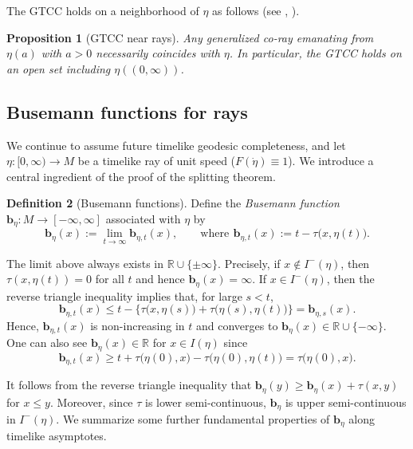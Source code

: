 \documentclass[a4paper,11pt]{article}
\numberwithin{equation}{section}
\theoremstyle{definition}
\newtheorem{definition}{Definition}[section]
\theoremstyle{plain}
\newtheorem{proposition}[definition]{Proposition}
\newcommand{\lra}{\longrightarrow}
\newcommand{\R}{\ensuremath{\mathbb{R}}}
\newcommand{\bb}{\ensuremath{\mathbf{b}}}
\begin{document}
The GTCC holds on a neighborhood of $\eta$ as follows (see \cite[Proposition~4.10]{LMO3}, \cite[Proposition~5.1, Corollary~5.2]{GH}).

\begin{proposition}[GTCC near rays]\label{pr:GH5.1}
Any generalized co-ray emanating from $\eta(a)$ with $a>0$
necessarily coincides with $\eta$.
In particular, the GTCC holds on an open set including $\eta((0,\infty))$.
\end{proposition}

\subsection{Busemann functions for rays}\label{ssc:rays}

We continue to assume future timelike geodesic completeness,
and let $\eta\colon [0,\infty)\lra M$ be a timelike ray of unit speed ($F(\dot{\eta}) \equiv 1$).
We introduce a central ingredient of the proof of the splitting theorem.

\begin{definition}[Busemann functions]\label{df:Buse}
Define the \emph{Busemann function} $\bb_{\eta}\colon M \lra [-\infty,\infty]$
associated with $\eta$ by
\[ \bb_{\eta}(x) :=\lim_{t \to \infty} \bb_{\eta,t}(x), \qquad
 \text{where}\,\ \bb_{\eta,t}(x) :=t-\tau\bigl( x,\eta(t) \bigr). \]
\end{definition}

The limit above always exists in $\R \cup \{\pm \infty\}$.
Precisely, if $x \not\in I^-(\eta)$, then $\tau(x,\eta(t))=0$ for all $t$ and hence $\bb_{\eta}(x)=\infty$.
If $x \in I^-(\eta)$, then the reverse triangle inequality implies that, for large $s<t$,
\[ \bb_{\eta,t}(x) \le t-\big\{ \tau\big( x,\eta(s) \big) +\tau\big( \eta(s),\eta(t) \big) \big\}
 =\bb_{\eta,s}(x). \]
Hence, $\bb_{\eta,t}(x)$ is non-increasing in $t$ and converges to $\bb_{\eta}(x) \in \R \cup \{-\infty\}$.
One can also see $\bb_\eta(x) \in \R$ for $x \in I(\eta)$ since
\[ \bb_{\eta,t}(x) \ge t +\tau\bigl( \eta(0),x \bigr) -\tau\bigl( \eta(0),\eta(t) \bigr) =\tau\bigl( \eta(0),x \bigr). \]

It follows from the reverse triangle inequality that $\bb_\eta(y) \ge \bb_\eta(x) +\tau(x,y)$ for $x \le y$.
Moreover, since $\tau$ is lower semi-continuous, $\bb_{\eta}$ is upper semi-continuous in $I^-(\eta)$.
We summarize some further fundamental properties of $\bb_\eta$ along timelike asymptotes.
\end{document}
